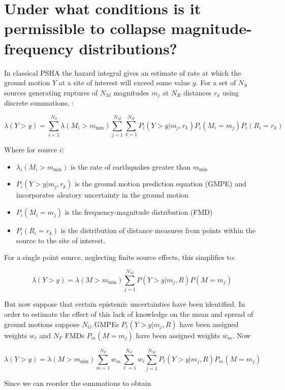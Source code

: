 \documentclass{article}
\begin{document}
\section{Under what conditions is it permissible to collapse magnitude-frequency distributions?}

In classical PSHA the hazard integral gives an estimate of rate at which the ground motion $Y$ at a site of interest will exceed some value $y$. For a set of $N_S$ sources generating ruptures of $N_M$ magnitudes $m_j$ at $N_R$ distances $r_k$ using discrete summations,  \citep{baker2008introduction}:

\begin{equation} \label{eq:HazardIntegral} 
\lambda(Y > y) = 
\sum_{i=1}^{N_S} 
\lambda(M_i > m_\text{min}) 
\sum_{j=1}^{N_M} 
\sum_{k=1}^{N_R} 
P_i(Y > y|m_j,r_k) 
P_i(M_i=m_j) 
P_i(R_i=r_k)
\end{equation}

Where for source $i$:
\begin{itemize}
\item $\lambda_i(M_i > m_\text{min})$ is the rate of earthquakes greater than $m_\text{min}$
\item $P_i(Y > y|m_j,r_k)$ is the ground motion prediction equation (GMPE) and incorporates aleatory uncertainty in the ground motion
\item $P_i(M_i=m_j)$ is the frequency-magnitude distribution (FMD)
\item $P_i(R_i=r_k)$ is the distribution of distance measures from points within the source to the site of interest.
\end{itemize}

For a single point source, neglecting finite source effects, this simplifies to:

$$ \lambda(Y > y) = 
\lambda(M > m_\text{min}) 
\sum_{j=1}^{N_M} 
P(Y > y|m_j,R) 
P(M=m_j) $$

But now suppose that certain epistemic uncertainties have been identified. In order to estimate the effect of this lack of knowledge on the mean and spread of ground motions suppose $N_G$ GMPEs $P_\ell(Y > y|m_j,R)$ have been assigned weights $w_\ell$ and $N_F$ FMDs $P_m(M=m_j)$ have been assigned weights $w_m$. Now

$$ \lambda(Y > y) = 
\lambda(M > m_\text{min}) 
\sum_{m=1}^{N_F} w_m 
\sum_{\ell=1}^{N_G} w_\ell 
\sum_{j=1}^{N_M} 
P_\ell(Y > y|m_j,R) 
P_m(M=m_j) $$

Since we can reorder the summations to obtain
\end{document}
